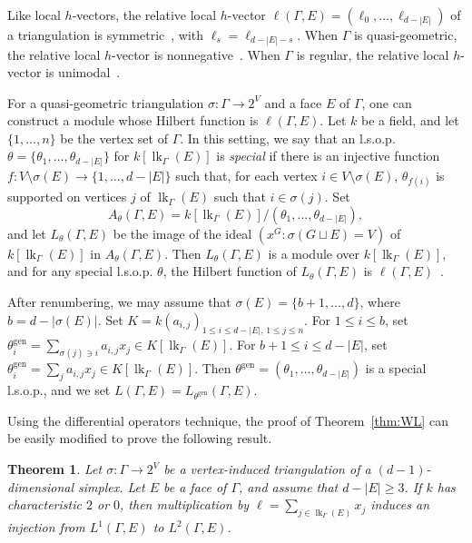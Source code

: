 \documentclass[11pt]{article}
\newtheorem{theo}{Theorem}[section]
\theoremstyle{definition}
\numberwithin{equation}{section}
\numberwithin{equation}{section}
\begin{document}
Like local $h$-vectors, the relative local $h$-vector $\ell(\Gamma, E) = (\ell_0, \dotsc, \ell_{d - |E|})$ of a triangulation is symmetric~\cite[Remark 3.7]{AthanasiadisFlag}, with $\ell_s = \ell_{d - |E| - s}$. When $\Gamma$ is quasi-geometric, the relative local $h$-vector is nonnegative~\cite{Athanasiadis12b,LPS1}. When $\Gamma$ is regular, the relative local $h$-vector is unimodal~\cite{KatzStapledon16}.

For a quasi-geometric triangulation $\sigma \colon \Gamma \to 2^V$ and a face $E$ of $\Gamma$, one can construct a module whose Hilbert function is $\ell(\Gamma, E)$. Let $k$ be a field, and let $\{ 1, \ldots, n \}$ be the vertex set of $\Gamma$. In this setting, we say that an l.s.o.p. $\theta = \{\theta_1, \dotsc, \theta_{d - |E|}\}$ for $k[\operatorname{lk}_{\Gamma}(E)]$ is \emph{special} if there is an injective function $f \colon V \setminus \sigma(E) \to \{1, \dotsc, d - |E|\}$ such that, for each vertex $i \in V \setminus \sigma(E)$, $\theta_{f(i)}$ is supported on vertices $j$ of $\operatorname{lk}_{\Gamma}(E)$ 
such that $i \in \sigma(j)$. Set
$$A_{\theta}(\Gamma, E) = k[\operatorname{lk}_{\Gamma}(E)]/(\theta_1, \dotsc, \theta_{d - |E|}),$$
and let $L_{\theta}(\Gamma, E)$  be the image of the ideal $(x^G : \sigma(G \sqcup E) = V)$ of $k[\operatorname{lk}_{\Gamma}(E)]$ in $A_{\theta}(\Gamma, E)$. Then $L_{\theta}(\Gamma, E)$ is a module over $k[\operatorname{lk}_{\Gamma}(E)]$, and for any special l.s.o.p. $\theta$, the Hilbert function of $L_{\theta}(\Gamma, E)$ is $\ell(\Gamma, E)$~\cite{Athanasiadis12b,LPS1}. 


After renumbering, we may assume that $\sigma(E) = \{b+1, \dotsc, d\}$, where $b = d - |\sigma(E)|$. Set $K = k(a_{i,j})_{1 \le i \le d - |E|, \, 1 \le j \le n}$. For $1 \le i \le b$, set $\theta_i^{\operatorname{gen}} = \sum_{\sigma(j) \ni i} a_{i,j} x_j \in K[\operatorname{lk}_{\Gamma}(E)]$. For $b+1 \le i \le d - |E|$, set $\theta_i^{\operatorname{gen}} = \sum_{j} a_{i,j} x_j \in K[\operatorname{lk}_{\Gamma}(E)]$. Then $\theta^{\operatorname{gen}} = (\theta_1, \dotsc, \theta_{d - |E|})$ is a special l.s.o.p., and we set $L(\Gamma, E) = L_{\theta^{\operatorname{gen}}}(\Gamma, E)$. 

Using the differential operators technique, the proof of Theorem~\ref{thm:WL} can be easily modified to prove the following result. 

\begin{theo}
Let $\sigma \colon \Gamma \to 2^V$ be a vertex-induced triangulation of a $(d-1)$-dimensional simplex. Let $E$ be a face of $\Gamma$, and assume that $d - |E| \ge 3$. If $k$ has characteristic $2$ or $0$, then multiplication by $\ell = 
\sum_{j \in \operatorname{lk}_{\Gamma}(E)} x_j$ induces an injection from $L^1(\Gamma, E)$ to $L^2(\Gamma, E)$. 
\end{theo}
\end{document}
